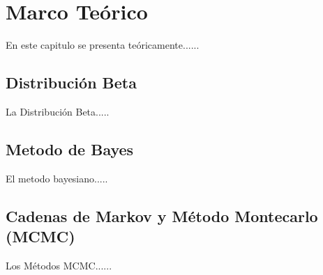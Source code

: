 \chapter{Marco Te\'{o}rico}

En este capitulo se presenta te\'{o}ricamente......

\section{Distribuci\'{o}n Beta}

La Distribuci\'{o}n Beta.....

\section{Metodo de Bayes}

El  metodo bayesiano.....

\section{Cadenas de Markov y M\'{e}todo Montecarlo (MCMC)}
Los M\'{e}todos MCMC......
